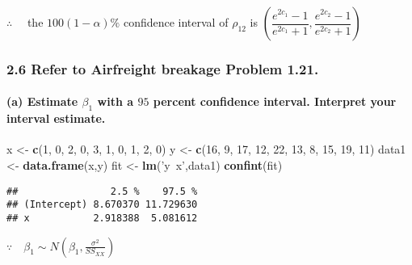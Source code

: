 \documentclass[]{article}
\newenvironment{Shaded}{\begin{snugshade}}{\end{snugshade}}
\newcommand{\KeywordTok}[1]{\textcolor[rgb]{0.13,0.29,0.53}{\textbf{#1}}}
\newcommand{\DecValTok}[1]{\textcolor[rgb]{0.00,0.00,0.81}{#1}}
\newcommand{\StringTok}[1]{\textcolor[rgb]{0.31,0.60,0.02}{#1}}
\newcommand{\NormalTok}[1]{#1}
\let\oldparagraph\paragraph
\renewcommand{\paragraph}[1]{\oldparagraph{#1}\mbox{}}
\begin{document}
\(\therefore\quad\) the \(100(1-\alpha)\%\) confidence interval of
\(\rho_{12}\) is
\(\left(\dfrac{e^{2c_1}-1}{e^{2c_1}+1},\dfrac{e^{2c_2}-1}{e^{2c_2}+1}\right)\)

\subsubsection{\texorpdfstring{2.6 Refer to \textbf{Airfreight breakage}
Problem
1.21.}{2.6 Refer to Airfreight breakage Problem 1.21.}}\label{refer-to-airfreight-breakage-problem-1.21.}

\paragraph{\texorpdfstring{(a) Estimate \(\beta_1\) with a \(95\)
percent confidence interval. Interpret your interval
estimate.}{(a) Estimate \textbackslash{}beta\_1 with a 95 percent confidence interval. Interpret your interval estimate.}}\label{a-estimate-beta_1-with-a-95-percent-confidence-interval.-interpret-your-interval-estimate.}

\begin{Shaded}
\begin{Highlighting}[]
\NormalTok{x <-}\StringTok{ }\KeywordTok{c}\NormalTok{(}\DecValTok{1}\NormalTok{, }\DecValTok{0}\NormalTok{, }\DecValTok{2}\NormalTok{, }\DecValTok{0}\NormalTok{, }\DecValTok{3}\NormalTok{, }\DecValTok{1}\NormalTok{, }\DecValTok{0}\NormalTok{, }\DecValTok{1}\NormalTok{, }\DecValTok{2}\NormalTok{, }\DecValTok{0}\NormalTok{)}
\NormalTok{y <-}\StringTok{ }\KeywordTok{c}\NormalTok{(}\DecValTok{16}\NormalTok{, }\DecValTok{9}\NormalTok{, }\DecValTok{17}\NormalTok{, }\DecValTok{12}\NormalTok{, }\DecValTok{22}\NormalTok{, }\DecValTok{13}\NormalTok{, }\DecValTok{8}\NormalTok{, }\DecValTok{15}\NormalTok{, }\DecValTok{19}\NormalTok{, }\DecValTok{11}\NormalTok{)}
\NormalTok{data1 <-}\StringTok{ }\KeywordTok{data.frame}\NormalTok{(x,y)}
\NormalTok{fit <-}\StringTok{ }\KeywordTok{lm}\NormalTok{(}\StringTok{'y~x'}\NormalTok{,data1)}
\KeywordTok{confint}\NormalTok{(fit) }
\end{Highlighting}
\end{Shaded}

\begin{verbatim}
##                2.5 %    97.5 %
## (Intercept) 8.670370 11.729630
## x           2.918388  5.081612
\end{verbatim}

\(\because\quad\beta_1\sim N(\beta_1,\frac{\sigma^2}{SS_{XX}})\)
\end{document}
